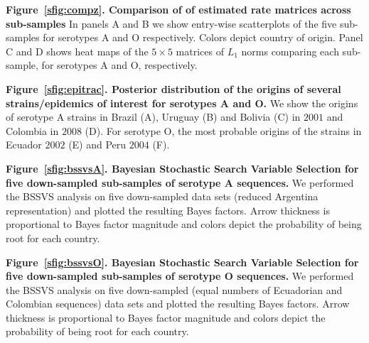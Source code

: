 \documentclass[a4paper,10pt]{article}
\begin{document}
\textbf{Figure~\ref{sfig:compz}. Comparison of of estimated rate matrices across sub-samples}
In panels A and B we show entry-wise scatterplots of the five sub-samples for serotypes A and O respectively.
Colors depict country of origin.
Panel C and D shows heat maps of the $5\times5$ matrices of $L_1$ norms comparing each sub-sample, for serotypes A and O, respectively.

\textbf{Figure~\ref{sfig:epitrac}. Posterior distribution of the origins of several strains/epidemics of interest for serotypes A and O.}
We show the origins of serotype A strains in  Brazil (A), Uruguay (B) and Bolivia (C) in $2001$ and Colombia in $2008$ (D).
For serotype O, the most probable origins of the strains in Ecuador $2002$ (E) and Peru $2004$ (F).
 
\textbf{Figure~\ref{sfig:bssvsA}. Bayesian Stochastic Search Variable Selection for five down-sampled sub-samples of serotype A sequences.}
We performed the BSSVS analysis on five down-sampled data sets (reduced Argentina representation) and plotted the resulting Bayes factors.
Arrow thickness is proportional to Bayes factor magnitude and colors depict the probability of being root for each country.

\textbf{Figure~\ref{sfig:bssvsO}. Bayesian Stochastic Search Variable Selection for five down-sampled sub-samples of serotype O sequences.}
We performed the BSSVS analysis on five down-sampled (equal numbers of Ecuadorian and Colombian sequences) data sets and  plotted the resulting Bayes factors.
Arrow thickness is proportional to Bayes factor magnitude and colors depict the probability of being root for each country.
\end{document}
